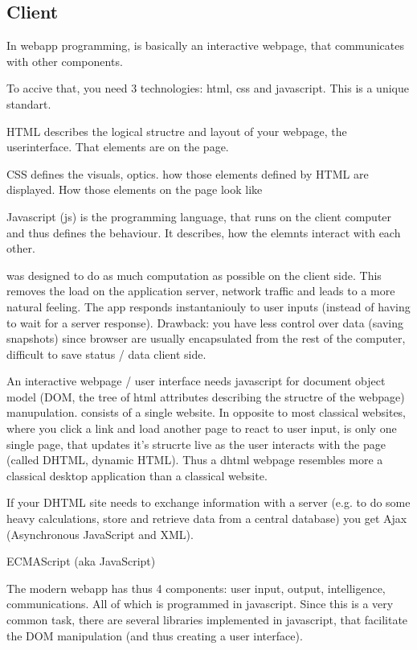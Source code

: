 \subsection{Client}
\label{sec:client}

In webapp programming, is basically an interactive webpage, that communicates with other components.

To accive that, you need 3 technologies: html, css and javascript. This is a unique standart.

HTML describes the logical structre and layout of your webpage, the userinterface. That elements are on the page.

CSS defines the visuals, optics. how those elements defined by HTML are displayed. How those elements on the page look like

Javascript (js) is the programming language, that runs on the client computer and thus defines the behaviour. It describes, how the elemnts interact with each other.


\spl was designed to do as much computation as possible on the client side. This removes the load on the application server, network traffic and leads to a more natural feeling. The app responds instantaniouly to user inputs (instead of having to wait for a server response). Drawback: you have less control over data (saving snapshots) since browser are usually encapsulated from the rest of the computer, difficult to save status / data client side.


An interactive webpage / user interface needs javascript for document object model (DOM, the tree of html attributes describing the structre of the webpage) manupulation.
\spl consists of a single website.
In opposite to most classical websites, where you click a link and load another page to react to user input, \spl is only one single page, that updates it's strucrte live as the user interacts with the page (called DHTML, dynamic HTML).
Thus a dhtml webpage resembles more a classical desktop application than a classical website.

If your DHTML site needs to exchange information with a server (e.g. to do some heavy calculations, store and retrieve data from a central database) you get Ajax (Asynchronous JavaScript and XML).




ECMAScript (aka JavaScript)


The modern webapp has thus 4 components: user input, output, intelligence, communications.
All of which is programmed in javascript.
Since this is a very common task, there are several libraries implemented in javascript, that facilitate the DOM manipulation (and thus creating a user interface).

